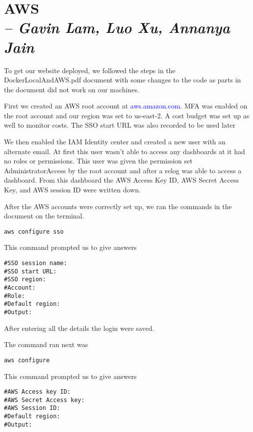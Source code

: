 \chapter{AWS \\
\small{\textit{-- Gavin Lam, Luo Xu, Annanya Jain}
\label{Chapter::AWS}}}

To get our website deployed, we followed the steps in the DockerLocalAndAWS.pdf document with some changes to the code as parts in the document did not work on our machines.\medskip

\noindent First we created an AWS root account at \textcolor{blue}{aws.amazon.com}. MFA was enabled on the root account and our region was set to us-east-2. A cost budget was set up as well to monitor costs. The SSO start URL was also recorded to be used later\medskip

\noindent We then enabled the IAM Identity center and created a new user with an alternate email. At first this user wasn't able to access any dashboards at it had no roles or permissions. This user was given the permission set AdministratorAccess by the root account and after a relog was able to access a dashboard. From this dashboard the AWS Access Key ID, AWS Secret Access Key, and AWS session ID were written down. \medskip

\noindent After the AWS accounts were correctly set up, we ran the commands in the document on the terminal.
\begin{verbatim}
aws configure sso
\end{verbatim}

\noindent This command prompted us to give answers

\begin{verbatim}
#SSO session name:
#SSO start URL:
#SSO region:
#Account:
#Role:
#Default region:
#Output:
\end{verbatim}

\noindent After entering all the details the login were saved.

The command ran next was 

\begin{verbatim}
aws configure 
\end{verbatim}

\noindent This command prompted us to give answers

\begin{verbatim}
#AWS Access key ID:
#AWS Secret Access key:
#AWS Session ID:
#Default region:
#Output:
\end{verbatim}

